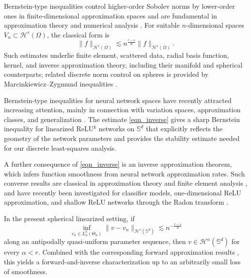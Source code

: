 \documentclass{article}
\numberwithin{equation}{section}
\begin{document}
Bernstein-type inequalities control higher-order Sobolev norms by lower-order ones in finite-dimensional approximation spaces and are fundamental in approximation theory and numerical analysis \cite{bernstein1912quelques,nikolskii1975approximation,georgoulis2008inverse}. For suitable $n$-dimensional spaces $V_n\subset\mathcal H^r(\Omega)$, the classical form is
\begin{equation*}
    \|f\|_{\mathcal H^r(\Omega)}\lesssim n^{\frac{r-s}{d}}\|f\|_{\mathcal H^s(\Omega)}.
\end{equation*}
Such estimates underlie finite element, scattered data, radial basis function, kernel, and inverse approximation theory, including their manifold and spherical counterparts; related discrete norm control on spheres is provided by Marcinkiewicz--Zygmund inequalities \cite{arcangeli2014sampling,arcangeli2007extension,devore1989optimal,mhaskar2020kernel,narcowich2005sobolev,narcowich2006sobolev,hangelbroek2018inverse,marzo2007marcinkiewicz,mhaskar2001spherical}.

Bernstein-type inequalities for neural network spaces have recently attracted increasing attention, mainly in connection with variation spaces, approximation classes, and generalization \cite{siegel2022sharp,siegel2023characterization,guo2020optimal,E2019,bernstein2020distance,huang2023generalization}. The estimate \eqref{eqn_inverse} gives a sharp Bernstein inequality for linearized ReLU$^k$ networks on $\mathbb S^d$ that explicitly reflects the geometry of the network parameters and provides the stability estimate needed for our discrete least-squares analysis.

A further consequence of \eqref{eqn_inverse} is an inverse approximation theorem, which infers function smoothness from neural network approximation rates. Such converse results are classical in approximation theory and finite element analysis \cite{zhou2006approximation,maiorov2006pseudo}, and have recently been investigated for classifier models, one-dimensional ReLU approximation, and shallow ReLU networks through the Radon transform \cite{wang2023inverse,coroianu2024best,mao2024approximation}.

In the present spherical linearized setting, if
\begin{equation*}
    \inf_{v_n\in L_n^k(\Theta_n)}\|v-v_n\|_{\mathcal H^s(\mathbb S^d)}
    \lesssim n^{-\frac{r-s}{d}}
\end{equation*}
along an antipodally quasi-uniform parameter sequence, then $v\in\mathcal H^\alpha(\mathbb S^d)$ for every $\alpha<r$. Combined with the corresponding forward approximation results \cite{liu2025integral,siegel2022sharp,yang2024optimal,parhi2022near}, this yields a forward-and-inverse characterization up to an arbitrarily small loss of smoothness.
\end{document}
